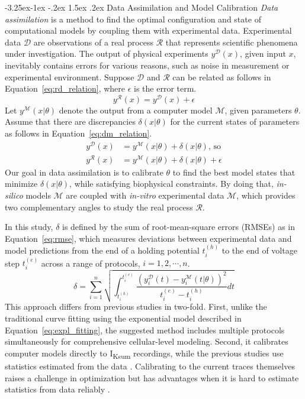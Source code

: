 \documentclass[11pt]{article}
\makeatletter
\renewcommand\subsection{\@startsection{subsection}{2}{\z@}%
                                     {-3.25ex\@plus -1ex \@minus -.2ex}%
                                     {1.5ex \@plus .2ex}%
                                     {\normalfont\fontfamily{phv}\fontsize{14}{17}\bfseries}}
\makeatother
\begin{document}
\subsection{Data Assimilation and Model Calibration}
\textit{Data assimilation} is a method to find the optimal configuration and state of computational models by coupling them with experimental data. Experimental data $\mathcal{D}$ are observations of a real process $\mathcal{R}$ that represents scientific phenomena under investigation. The output of physical experiments $y^{\mathcal{D}}(x)$, given input $x$, inevitably contains errors for various reasons, such as noise in measurement or experimental environment. Suppose $\mathcal{D}$ and $\mathcal{R}$ can be related as follows in Equation~\ref{eq:rd_relation}, where $\epsilon$ is the error term. 
\begin{equation}
    \label{eq:rd_relation}
    y^{\mathcal{R}}(x) = y^{\mathcal{D}}(x) + \epsilon
\end{equation}
Let $y^{\mathcal{M}}(x|\theta)$ denote the output from a computer model $\mathcal{M}$, given parameters $\theta$. Assume that there are discrepancies $\delta(x|\theta)$ for the current states of parameters as follows in Equation~\ref{eq:dm_relation}. 
\begin{align}
    \label{eq:dm_relation}
    y^{\mathcal{D}}(x) &= y^{\mathcal{M}}(x|\theta) + \delta(x|\theta) \text{, so} \\
    y^{\mathcal{R}}(x) &= y^{\mathcal{M}}(x|\theta) + \delta(x|\theta) + \epsilon
\end{align}
Our goal in data assimilation is to calibrate $\theta$ to find the best model states that minimize $\delta(x|\theta)$, while satisfying biophysical constraints. By doing that, \textit{in-silico} models $\mathcal{M}$ are coupled with \textit{in-vitro} experimental data $\mathcal{M}$, which provides two complementary angles to study the real process $\mathcal{R}$.

In this study, $\delta$ is defined by the sum of root-mean-square errors (RMSEs) as in Equation~\ref{eq:rmse}, which measures deviations between experimental data and model predictions from the end of a holding potential $t_i^{(h)}$ to the end of voltage step $t_i^{(e)}$ across a range of protocols, $i=1,2,\cdots,n$.
\begin{equation}
    \label{eq:rmse}
    \delta = \sum_{i=1}^{n} \sqrt{\int_{t_i^{(h)}}^{t_i^{(e)}}\frac{(y_i^{\mathcal{D}}(t) - y_i^{\mathcal{M}}(t|\theta))^2}{t_i^{(e)}-t_i^{(h)}}dt}
\end{equation}
This approach differs from previous studies in two-fold. First, unlike the traditional curve fitting using the exponential model described in Equation~\ref{eq:expl_fitting}, the suggested method includes multiple protocols simultaneously for comprehensive cellular-level modeling. Second, it calibrates computer models directly to I\textsubscript{Ksum} recordings, while the previous studies use statistics estimated from the data \citep{du2015statistical, du2017silico, kim2022simulation}. Calibrating to the current traces themselves raises a challenge in optimization but has advantages when it is hard to estimate statistics from data reliably \citep{kim2022simulation}.
\end{document}
